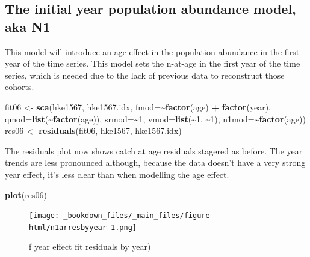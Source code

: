 \documentclass[
]{book}
\newenvironment{Shaded}{\begin{snugshade}}{\end{snugshade}}
\newcommand{\AttributeTok}[1]{\textcolor[rgb]{0.13,0.29,0.53}{#1}}
\newcommand{\DecValTok}[1]{\textcolor[rgb]{0.00,0.00,0.81}{#1}}
\newcommand{\FunctionTok}[1]{\textcolor[rgb]{0.13,0.29,0.53}{\textbf{#1}}}
\newcommand{\NormalTok}[1]{#1}
\newcommand{\OtherTok}[1]{\textcolor[rgb]{0.56,0.35,0.01}{#1}}
\newcommand{\SpecialCharTok}[1]{\textcolor[rgb]{0.81,0.36,0.00}{\textbf{#1}}}
\begin{document}
\hypertarget{the-initial-year-population-abundance-model-aka-n1}{%
\subsection{The initial year population abundance model, aka N1}\label{the-initial-year-population-abundance-model-aka-n1}}

This model will introduce an age effect in the population abundance in the first year of the time series. This model sets the n-at-age in the first year of the time series, which is needed due to the lack of previous data to reconstruct those cohorts.

\begin{Shaded}
\begin{Highlighting}[]
\NormalTok{fit06 }\OtherTok{\textless{}{-}} \FunctionTok{sca}\NormalTok{(hke1567, hke1567.idx, }\AttributeTok{fmod=}\SpecialCharTok{\textasciitilde{}}\FunctionTok{factor}\NormalTok{(age) }\SpecialCharTok{+} \FunctionTok{factor}\NormalTok{(year), }\AttributeTok{qmod=}\FunctionTok{list}\NormalTok{(}\SpecialCharTok{\textasciitilde{}}\FunctionTok{factor}\NormalTok{(age)), }\AttributeTok{srmod=}\SpecialCharTok{\textasciitilde{}}\DecValTok{1}\NormalTok{, }\AttributeTok{vmod=}\FunctionTok{list}\NormalTok{(}\SpecialCharTok{\textasciitilde{}}\DecValTok{1}\NormalTok{, }\SpecialCharTok{\textasciitilde{}}\DecValTok{1}\NormalTok{),  }\AttributeTok{n1mod=}\SpecialCharTok{\textasciitilde{}}\FunctionTok{factor}\NormalTok{(age))}
\NormalTok{res06 }\OtherTok{\textless{}{-}} \FunctionTok{residuals}\NormalTok{(fit06, hke1567, hke1567.idx)}
\end{Highlighting}
\end{Shaded}

The residuals plot now shows catch at age residuals stagered as before. The year trends are less pronounced although, because the data doesn't have a very strong year effect, it's less clear than when modelling the age effect.

\begin{Shaded}
\begin{Highlighting}[]
\FunctionTok{plot}\NormalTok{(res06)}
\end{Highlighting}
\end{Shaded}

\begin{figure}
\centering
\texttt{[image: \_bookdown\_files/\_main\_files/figure-html/n1arresbyyear-1.png]}
\caption{\label{fig:n1arresbyyear}f year effect fit residuals by year)}
\end{figure}
\end{document}
